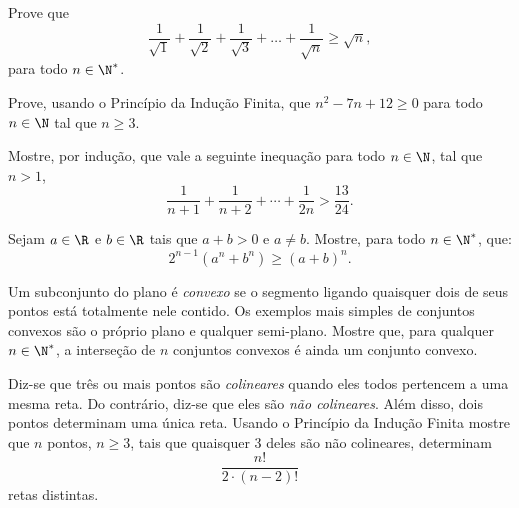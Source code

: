 \begin{exercise}
Prove que
$$\frac 1 {\sqrt 1} +\frac 1 {\sqrt 2} +\frac 1 {\sqrt 3} + \dots + \frac 1 {\sqrt n} \geq \sqrt n,$$
para todo $ n \in \N^*$.
\end{exercise}

\begin{exercise}\label{exercicio:polinomio}
	Prove, usando o Princípio da Indução Finita, que $n^2 - 7n +12 \geq 0$ para todo $n \in \N$ tal que $n \geq 3$.
\end{exercise}

\begin{exercise}
	Mostre, por indução, que vale a seguinte inequação para todo $n \in \N$, tal que $n > 1$,
	$$\dfrac 1 {n+1} + \dfrac 1 {n+2} + \cdots + \dfrac 1 {2n} > \dfrac {13}{24}.$$
\end{exercise}

\begin{exercise}
	Sejam $a \in \R$ e $b \in \R$ tais que $a+b>0$ e $a \neq b$. Mostre, para todo $n \in \N^\ast$, que:
            $$ 2^{n-1}(a^n + b^n) \geq (a+b)^n .$$
\end{exercise}

\begin{exercise}
Um subconjunto do plano é \emph{convexo} se o segmento ligando quaisquer dois de seus pontos está totalmente nele contido.
Os exemplos mais simples de conjuntos convexos são o próprio plano e qualquer semi-plano.
Mostre que, para qualquer $n \in \N^*$, a interseção de $n$ conjuntos convexos é ainda um conjunto convexo.
\end{exercise}

\begin{exercise}
Diz-se que três ou mais pontos são \emph{colineares} quando eles todos pertencem a uma mesma reta.
Do contrário, diz-se que eles são \emph{não colineares}.
Além disso, dois pontos determinam uma única reta.
Usando o Princípio da Indução Finita mostre que $n$ pontos, $n\geq 3$, tais que quaisquer 3 deles são não colineares, determinam
$$\frac{n!}{2\cdot(n-2)!}$$
retas distintas.
\end{exercise}

